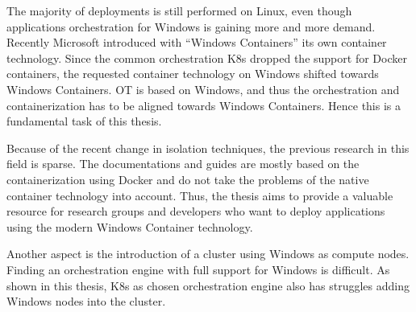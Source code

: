 The majority of deployments is still performed on Linux, even though applications orchestration for \ac{Windows} is gaining more and more demand. Recently Microsoft introduced with \enquote{Windows Containers} its own container technology\cite{Microsoft.2022}. Since the common orchestration \acf{K8s} dropped the support for Docker containers, the requested container technology on \ac{Windows} shifted towards Windows Containers\cite{Kubernetes.2020}.
\ac{OT} is based on \ac{Windows}, and thus the orchestration and containerization has to be aligned towards Windows Containers. Hence this is a fundamental task of this thesis.

Because of the recent change in isolation techniques, the previous research in this field is sparse. The documentations and guides are mostly based on the containerization using Docker and do not take the problems of the native container technology into account. 
Thus, the thesis aims to provide a valuable resource for research groups and developers who want to deploy applications using the modern Windows Container technology.

Another aspect is the introduction of a cluster using \ac{Windows} as compute nodes. Finding an orchestration engine with full support for \ac{Windows} is difficult. As shown in this thesis, \ac{K8s} as chosen orchestration engine also has struggles adding \ac{Windows} nodes into the cluster.

\begin{comment}
Nevertheless, the benefits come with the price of required application changes and higher system requirements.

Because 
Microservice applications consist of multiple services where each service fulfills its specific task. They meet the requirements for 


Applications that are served on a cluster need to fulfill the corresponding architecture requirements for a cluster environment.  and they 

This thesis explores the design and development of an cluster for an microservice application.
With regards to the automation of steps.

The requirements for serving applications in a cluster are the underlying

 the dependency on external services is high. 

The application under study, \acf{OT}, is well prepared for a cluster deployment.

\ac{K8s} was mainly used on Linux systems in the past

 there is a growing need to deploy microservice applications on Windows platforms as well. 

The thesis examines the challenges involved in deploying such an application on Windows


The research field of cluster deployment with ContainerD is still in the beginning state for \ac{Windows}.
\end{comment}


